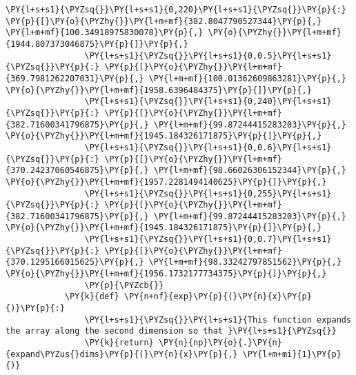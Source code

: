 \begin{Verbatim}[commandchars=\\\{\}]
                \PY{l+s+s1}{\PYZsq{}}\PY{l+s+s1}{0,220}\PY{l+s+s1}{\PYZsq{}}\PY{p}{:} \PY{p}{[}\PY{o}{\PYZhy{}}\PY{l+m+mf}{382.8047790527344}\PY{p}{,} \PY{l+m+mf}{100.34918975830078}\PY{p}{,} \PY{o}{\PYZhy{}}\PY{l+m+mf}{1944.807373046875}\PY{p}{]}\PY{p}{,}
                \PY{l+s+s1}{\PYZsq{}}\PY{l+s+s1}{0,0.5}\PY{l+s+s1}{\PYZsq{}}\PY{p}{:} \PY{p}{[}\PY{o}{\PYZhy{}}\PY{l+m+mf}{369.7981262207031}\PY{p}{,} \PY{l+m+mf}{100.01362609863281}\PY{p}{,} \PY{o}{\PYZhy{}}\PY{l+m+mf}{1958.6396484375}\PY{p}{]}\PY{p}{,}
                \PY{l+s+s1}{\PYZsq{}}\PY{l+s+s1}{0,240}\PY{l+s+s1}{\PYZsq{}}\PY{p}{:} \PY{p}{[}\PY{o}{\PYZhy{}}\PY{l+m+mf}{382.71600341796875}\PY{p}{,} \PY{l+m+mf}{99.87244415283203}\PY{p}{,} \PY{o}{\PYZhy{}}\PY{l+m+mf}{1945.184326171875}\PY{p}{]}\PY{p}{,}
                \PY{l+s+s1}{\PYZsq{}}\PY{l+s+s1}{0,0.6}\PY{l+s+s1}{\PYZsq{}}\PY{p}{:} \PY{p}{[}\PY{o}{\PYZhy{}}\PY{l+m+mf}{370.24237060546875}\PY{p}{,} \PY{l+m+mf}{98.66026306152344}\PY{p}{,} \PY{o}{\PYZhy{}}\PY{l+m+mf}{1957.2281494140625}\PY{p}{]}\PY{p}{,}
                \PY{l+s+s1}{\PYZsq{}}\PY{l+s+s1}{0,255}\PY{l+s+s1}{\PYZsq{}}\PY{p}{:} \PY{p}{[}\PY{o}{\PYZhy{}}\PY{l+m+mf}{382.71600341796875}\PY{p}{,} \PY{l+m+mf}{99.87244415283203}\PY{p}{,} \PY{o}{\PYZhy{}}\PY{l+m+mf}{1945.184326171875}\PY{p}{]}\PY{p}{,}
                \PY{l+s+s1}{\PYZsq{}}\PY{l+s+s1}{0,0.7}\PY{l+s+s1}{\PYZsq{}}\PY{p}{:} \PY{p}{[}\PY{o}{\PYZhy{}}\PY{l+m+mf}{370.1295166015625}\PY{p}{,} \PY{l+m+mf}{98.33242797851562}\PY{p}{,} \PY{o}{\PYZhy{}}\PY{l+m+mf}{1956.1732177734375}\PY{p}{]}\PY{p}{,}
                \PY{p}{\PYZcb{}}
            \PY{k}{def} \PY{n+nf}{exp}\PY{p}{(}\PY{n}{x}\PY{p}{)}\PY{p}{:}
                \PY{l+s+s1}{\PYZsq{}}\PY{l+s+s1}{This function expands the array along the second dimension so that }\PY{l+s+s1}{\PYZsq{}}
                \PY{k}{return} \PY{n}{np}\PY{o}{.}\PY{n}{expand\PYZus{}dims}\PY{p}{(}\PY{n}{x}\PY{p}{,} \PY{l+m+mi}{1}\PY{p}{)}
            

\end{Verbatim}
